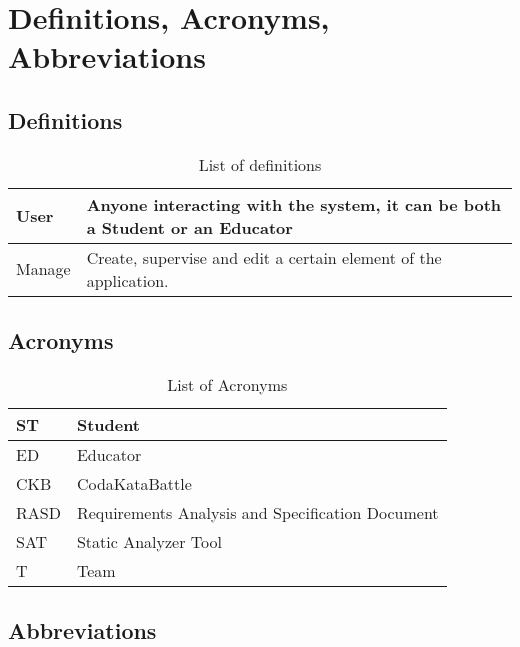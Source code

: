 \section{Definitions, Acronyms, Abbreviations}
\label{s:Definitions_Acronyms_Abbreviations}%

\subsection{Definitions}
\label{ss:Definitions}

\begin{table}[H]
  \begin{tabular}{|l|l|}

    \hline
    User & Anyone interacting with the system, it can be both a Student or an Educator    \\
    \hline
    Manage & Create, supervise and edit a certain element of the application. \\
    \hline
  \end{tabular}
  \caption{List of definitions}
  \label{tab:definitions}
\end{table}

\subsection{Acronyms}
\label{ss:Acronyms}

\begin{table}[H]
  \begin{tabular}{|l|l|}

    \hline
    ST & Student \\
    \hline
    ED & Educator \\
    \hline
    CKB & CodaKataBattle \\
    \hline
    RASD & Requirements Analysis and Specification Document     \\
    \hline
    SAT & Static Analyzer Tool    \\
    \hline
    T & Team    \\
    \hline
  \end{tabular}
  \caption{List of Acronyms}
  \label{tab:acronyms}
\end{table}

\subsection{Abbreviations}
\label{ss:Abbreviations}


